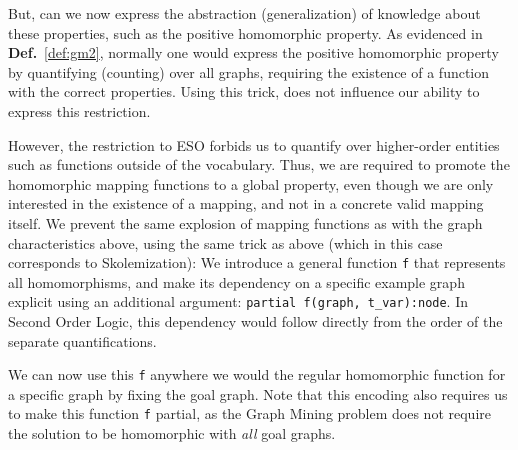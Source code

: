 \documentclass{article}
\theoremstyle{definition}
\begin{document}

But, can we now express the abstraction (generalization) of knowledge about these properties, such as the positive homomorphic property.
As evidenced in \textbf{Def.}~\ref{def:gm2}, normally one would express the positive homomorphic property by quantifying (counting) over all graphs, requiring the existence of a function with the correct properties.
Using this trick, does not influence our ability to express this restriction.

However, the restriction to ESO forbids us to quantify over higher-order entities such as functions outside of the vocabulary.
Thus, we are required to promote the homomorphic mapping functions to a global property, even though we are only interested in the existence of a mapping, and not in a concrete valid mapping itself.
We prevent the same explosion of mapping functions as with the graph characteristics above, using the same trick as above (which in this case corresponds to Skolemization):
We introduce a general function \verb|f| that represents all homomorphisms, and make its dependency on a specific example graph explicit using an additional argument:
\verb|partial f(graph, t_var):node|.
In Second Order Logic, this dependency would follow directly from the order of the separate quantifications.

We can now use this \verb|f| anywhere we would the regular homomorphic function for a specific graph by fixing the goal graph.
Note that this encoding also requires us to make this function \verb|f| partial, as the Graph Mining problem does not require the solution to be homomorphic with \emph{all} goal graphs.
\end{document}
